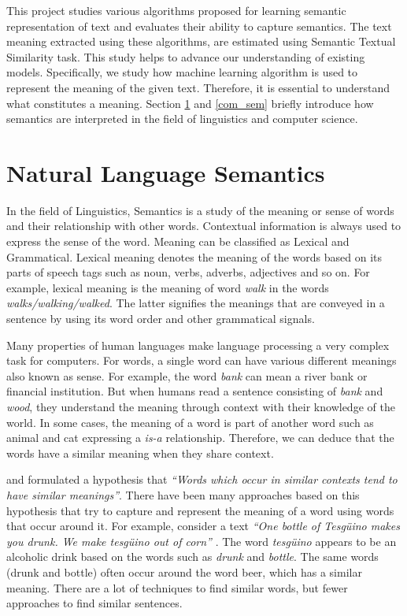 \documentclass[12pt]{report} %
\begin{document}
	This project studies various algorithms proposed for learning semantic representation of text and evaluates their ability to capture semantics. The text meaning extracted using these algorithms, are estimated using Semantic Textual Similarity task. This study helps to advance our understanding of existing models. Specifically, we study how machine learning algorithm is used to represent the meaning of the given text. Therefore, it is essential to understand what constitutes a meaning. Section \ref{nlp_sem} and \ref{com_sem} briefly introduce how semantics are interpreted in the field of linguistics and computer science.

	
	\section{Natural Language Semantics}
	\label{nlp_sem} 
	
	In the field of Linguistics, Semantics is a study of the meaning or sense of words and their relationship with other words. Contextual information is always used to express the sense of the word. Meaning can be classified as Lexical and Grammatical. Lexical meaning denotes the meaning of the words based on its parts of speech tags such as noun, verbs, adverbs, adjectives and so on. For example, lexical meaning is the meaning of word \textit{walk} in the words \textit{walks/walking/walked}. The latter signifies the meanings that are conveyed in a sentence by using its word order and other grammatical signals.
	
	
	Many properties of human languages make language processing a very complex task for computers. For words, a single word can have various different meanings also known as sense. For example, the word \textit{bank} can mean a river bank or financial institution. But when humans read a sentence consisting of \textit{bank} and\textit{ wood}, they understand the meaning through context with their knowledge of the world. In some cases, the meaning of a word is part of another word such as animal and cat expressing a \textit{is-a} relationship. Therefore, we can deduce that the words have a similar meaning when they share context.
	
	\cite{harris1970distributional} and \cite{firth1957synopsis} formulated a hypothesis that \textit{ \textquotedblleft Words which occur in similar contexts tend to have similar meanings\textquotedblright}. There have been many approaches based on this hypothesis that try to capture and represent the meaning of a word using words that occur around it. For example, consider a text \textit{ \textquotedblleft One bottle of Tesgüino makes you drunk. We make tesgüino out of corn\textquotedblright} \citep{jurafsky2014speech}.  The word \textit{tesgüino}  appears to be an alcoholic drink based on the words such as \textit{drunk} and \textit{bottle}. The same words (drunk and bottle) often occur around the word beer, which has a similar meaning. There are a lot of techniques to find similar words, but fewer approaches to find similar sentences.
	
\end{document}
